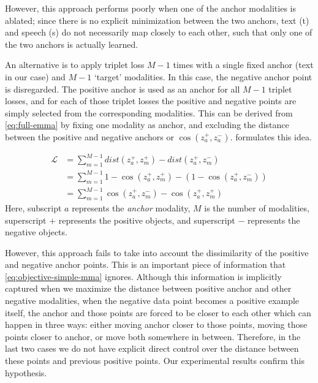 However, this approach performs poorly when one of the anchor modalities is ablated; since there is no explicit minimization between the two anchors, text (t) and speech (s) do not necessarily map closely to each other, such that only one of the two anchors is actually learned. 





An alternative is to apply triplet loss $M-1$ times with a single fixed anchor (text in our case) and $M-1$ `target' modalities.  In this case, the negative anchor point is disregarded. The positive anchor is used as an anchor for all $M-1$ triplet losses, and for each of those triplet losses the positive and negative points are simply selected from the corresponding modalities. This can be derived from \cref{eq:full-emma} by fixing one modality as anchor, and excluding the distance between the positive and negative anchors or $\cos(z_{a}^{+}, z_{a}^{-})$.
 formulates this idea.

\begin{equation}
\label{eq:objective-simple-mma}
\begin{split}
    \mathcal{L}  &= \sum_{m=1}^{M-1} dist( z_{a}^{+} , z_{m}^{+} ) - dist( z_{a}^{+} , z_{m}^{-} ) \\
    &= \sum_{m=1}^{M-1} 1 - \cos(z_{a}^{+}, z_{m}^{+}) - (1 - \cos(z_{a}^{+}, z_{m}^{-})) \\
    &= \sum_{m=1}^{M-1} \cos(z_{a}^{+} ,z_{m}^{-}) - \cos(z_{a}^{+}, z_{m}^{+})
\end{split}
\end{equation}
Here, subscript $a$ represents the \textit{anchor} modality, $M$ is the number of modalities, superscript $+$ represents the positive objects, and superscript $-$ represents the negative objects.

However, this approach fails to take into account the dissimilarity of the positive and negative anchor points. This is an important piece of information that \cref{eq:objective-simple-mma} ignores. Although this information is implicitly captured when we maximize the distance between positive anchor and other negative modalities, when the negative data point becomes a positive example itself, the anchor and those points are forced to be closer to each other which can happen in three ways: either moving anchor closer to those points, moving those points closer to anchor, or move both somewhere in between. Therefore, in the last two cases we do not have explicit direct control over the distance between these points and previous positive points. Our experimental results confirm this hypothesis.

